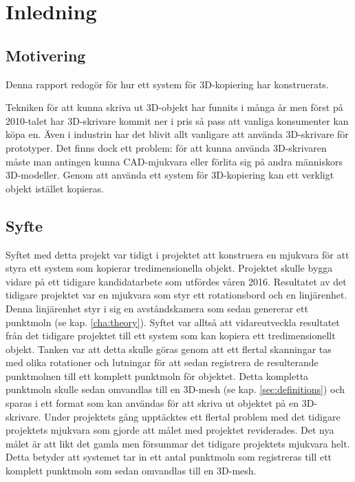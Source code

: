 \chapter{Inledning}
\label{cha:introduction}

\section{Motivering}
\label{sec:motivation}

Denna rapport redogör för hur ett system för 3D-kopiering har konstruerats. 

Tekniken för att kunna skriva ut 3D-objekt har funnits i många år men först på 2010-talet har 3D-skrivare kommit ner i pris så pass att vanliga konsumenter kan köpa en. Även i industrin har det blivit allt vanligare att använda 3D-skrivare för prototyper. Det finns dock ett problem: för att kunna använda 3D-skrivaren måste man antingen kunna CAD-mjukvara eller förlita sig på andra människors 3D-modeller. Genom att använda ett system för 3D-kopiering kan ett verkligt objekt istället kopieras.


\section{Syfte}
\label{sec:aim}

Syftet med detta projekt var tidigt i projektet att konstruera en mjukvara för att styra ett system som kopierar tredimensionella objekt. Projektet skulle bygga vidare på ett tidigare kandidatarbete som utfördes våren 2016. Resultatet av det tidigare projektet var en mjukvara som styr ett rotationsbord och en linjärenhet. Denna linjärenhet styr i sig en avståndskamera som sedan genererar ett punktmoln (se kap. \ref{cha:theory}). Syftet var alltså att vidareutveckla resultatet från det tidigare projektet till ett system som kan kopiera ett tredimensionellt objekt. Tanken var att detta skulle göras genom att ett flertal skanningar tas med olika rotationer och lutningar för att sedan registrera de resulterande punktmolnen till ett komplett punktmoln för objektet. Detta kompletta punktmoln skulle sedan omvandlas till en 3D-mesh (se kap. \ref{sec:definitions}) och sparas i ett format som kan användas för att skriva ut objektet på en 3D-skrivare.  Under projektets gång upptäcktes ett flertal problem med det tidigare projektets mjukvara som gjorde att målet med projektet reviderades. Det nya målet är att likt det gamla men försummar det tidigare projektets mjukvara helt. Detta betyder att systemet tar in ett antal punktmoln som registreras till ett komplett punktmoln som sedan omvandlas till en 3D-mesh.


